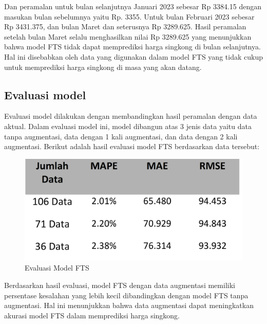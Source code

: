 \documentclass[conference]{IEEEtran}
\begin{document}
Dan peramalan untuk bulan selanjutnya Januari 2023 sebesar Rp 3384.15 dengan masukan bulan sebelumnya yaitu Rp. 3355. Untuk bulan Februari 2023 sebesar Rp 3431.375, dan bulan Maret dan seterusnya Rp 3289.625. Hasil peramalan setelah bulan Maret selalu menghasilkan nilai Rp 3289.625 yang menunjukkan bahwa model FTS tidak dapat memprediksi harga singkong di bulan selanjutnya. Hal ini disebabkan oleh data yang digunakan dalam model FTS yang tidak cukup untuk memprediksi harga singkong di masa yang akan datang.


\subsection{Evaluasi model}
Evaluasi model dilakukan dengan membandingkan hasil peramalan dengan data aktual. Dalam evaluasi model ini, model dibangun atas 3 jenis data yaitu data tanpa augmentasi, data dengan 1 kali augmentasi, dan data dengan 2 kali augmentasi. Berikut adalah hasil evaluasi model FTS berdasarkan data tersebut:
\begin{figure}[H]
    \centering
    \includegraphics[width=\columnwidth]{images/table_evaluasi.png} 
    \caption{Evaluasi Model FTS}
\end{figure}

Berdasarkan hasil evaluasi, model FTS dengan data augmentasi memiliki persentase kesalahan yang lebih kecil dibandingkan dengan model FTS tanpa augmentasi. Hal ini menunjukkan bahwa data augmentasi dapat meningkatkan akurasi model FTS dalam memprediksi harga singkong. 
\end{document}
